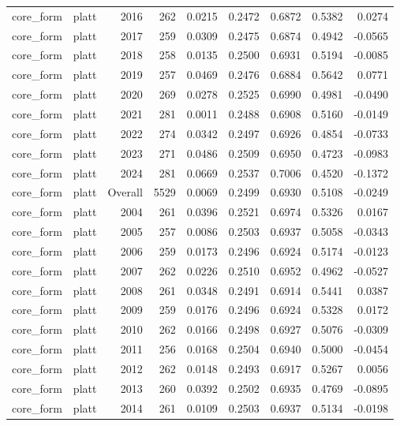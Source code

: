 \begin{table}[t]
\begin{tabular}{@{} l l r r r r r r r @{} }
      core\_form & platt & 2016 & 262 & 0.0215 & 0.2472 & 0.6872 & 0.5382 & 0.0274 \\
      core\_form & platt & 2017 & 259 & 0.0309 & 0.2475 & 0.6874 & 0.4942 & -0.0565 \\
      core\_form & platt & 2018 & 258 & 0.0135 & 0.2500 & 0.6931 & 0.5194 & -0.0085 \\
      core\_form & platt & 2019 & 257 & 0.0469 & 0.2476 & 0.6884 & 0.5642 & 0.0771 \\
      core\_form & platt & 2020 & 269 & 0.0278 & 0.2525 & 0.6990 & 0.4981 & -0.0490 \\
      core\_form & platt & 2021 & 281 & 0.0011 & 0.2488 & 0.6908 & 0.5160 & -0.0149 \\
      core\_form & platt & 2022 & 274 & 0.0342 & 0.2497 & 0.6926 & 0.4854 & -0.0733 \\
      core\_form & platt & 2023 & 271 & 0.0486 & 0.2509 & 0.6950 & 0.4723 & -0.0983 \\
      core\_form & platt & 2024 & 281 & 0.0669 & 0.2537 & 0.7006 & 0.4520 & -0.1372 \\
      core\_form & platt & Overall & 5529 & 0.0069 & 0.2499 & 0.6930 & 0.5108 & -0.0249 \\
      core\_form & platt & 2004 & 261 & 0.0396 & 0.2521 & 0.6974 & 0.5326 & 0.0167 \\
      core\_form & platt & 2005 & 257 & 0.0086 & 0.2503 & 0.6937 & 0.5058 & -0.0343 \\
      core\_form & platt & 2006 & 259 & 0.0173 & 0.2496 & 0.6924 & 0.5174 & -0.0123 \\
      core\_form & platt & 2007 & 262 & 0.0226 & 0.2510 & 0.6952 & 0.4962 & -0.0527 \\
      core\_form & platt & 2008 & 261 & 0.0348 & 0.2491 & 0.6914 & 0.5441 & 0.0387 \\
      core\_form & platt & 2009 & 259 & 0.0176 & 0.2496 & 0.6924 & 0.5328 & 0.0172 \\
      core\_form & platt & 2010 & 262 & 0.0166 & 0.2498 & 0.6927 & 0.5076 & -0.0309 \\
      core\_form & platt & 2011 & 256 & 0.0168 & 0.2504 & 0.6940 & 0.5000 & -0.0454 \\
      core\_form & platt & 2012 & 262 & 0.0148 & 0.2493 & 0.6917 & 0.5267 & 0.0056 \\
      core\_form & platt & 2013 & 260 & 0.0392 & 0.2502 & 0.6935 & 0.4769 & -0.0895 \\
      core\_form & platt & 2014 & 261 & 0.0109 & 0.2503 & 0.6937 & 0.5134 & -0.0198 \\

\end{tabular}
\end{table}
